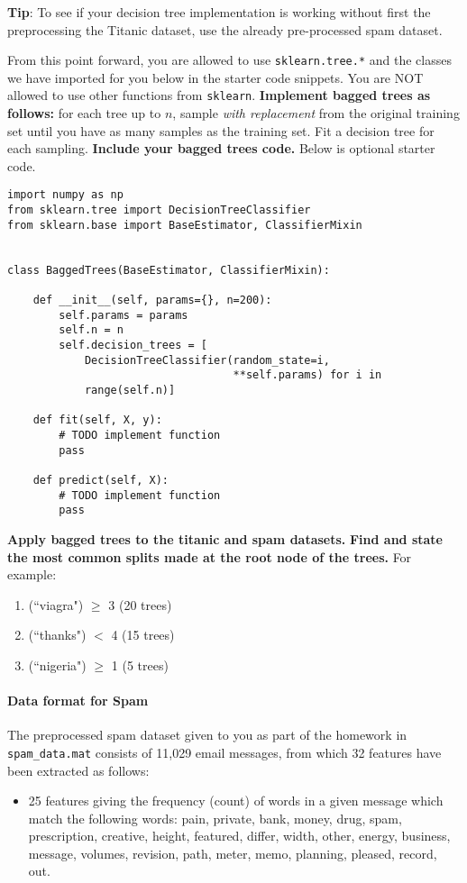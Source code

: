\begin{Parts}
\textbf{Tip}: To see if your decision tree implementation is working without first the preprocessing the Titanic dataset, use the already pre-processed spam dataset.



\Part From this point forward, you are allowed to use \texttt{sklearn.tree.*} and the classes we have imported for you below in the starter code snippets.
You are NOT allowed to use other functions from \texttt{sklearn}.
\textbf{Implement bagged trees as follows:} for each tree up to $n$, sample \textit{with replacement} from the original training set until you have as many samples as the training set.
Fit a decision tree for each sampling.
\textbf{Include your bagged trees code.} Below is optional starter code.

\begin{verbatim}
import numpy as np
from sklearn.tree import DecisionTreeClassifier
from sklearn.base import BaseEstimator, ClassifierMixin


class BaggedTrees(BaseEstimator, ClassifierMixin):

    def __init__(self, params={}, n=200):
        self.params = params
        self.n = n
        self.decision_trees = [
            DecisionTreeClassifier(random_state=i, 
                                   **self.params) for i in
            range(self.n)]

    def fit(self, X, y):
        # TODO implement function
        pass

    def predict(self, X):
        # TODO implement function
        pass
\end{verbatim}



\Part \textbf{Apply bagged trees to the titanic and spam datasets.} \textbf{Find and state the most common splits made at the root node of the trees.} For example:
	\begin{enumerate}
		\item (``viagra") $\geq$ 3 (20 trees)
		\item (``thanks") $<$ 4 (15 trees)
		\item (``nigeria") $\geq$ 1 (5 trees)
	\end{enumerate}

\paragraph{Data format for Spam}

The preprocessed spam dataset given to you as part of the homework in \texttt{spam\_data.mat} consists of 11,029 email messages, from which 32 features have been extracted as follows:
\begin{itemize}
\item 25 features giving the frequency (count) of words in a given message which match the following words: pain, private, bank, money, drug, spam, prescription, creative, height, featured, differ, width, other, energy, business, message, volumes, revision, path, meter, memo, planning, pleased, record, out.


\end{itemize}
\end{Parts}
